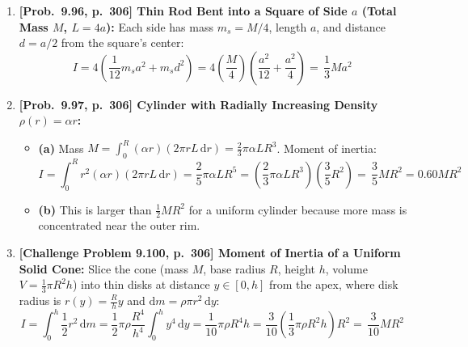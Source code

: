 \documentclass[11pt,a4paper,openany,oneside]{book}
\newcommand{\eqbox}[1]{\boxed{\,#1\,}}
\newcommand{\dd}{\,\mathrm{d}}
\newcommand{\diff}{\mathrm{d}}
\numberwithin{equation}{chapter}
\begin{document}
\begin{enumerate}[label=\textbf{Prob.\ 9.\arabic*},leftmargin=4.2em]
  \item \textbf{[Prob.\ 9.96, p.\ 306] Thin Rod Bent into a Square of Side $a$ (Total Mass $M$, $L=4a$):}
  Each side has mass $m_s = M/4$, length $a$, and distance $d = a/2$ from the square's center:
  \begin{equation*}
    I = 4\!\left(\frac{1}{12}m_s a^2 + m_s d^2\right) = 4\!\left(\frac{M}{4}\right)\!\left(\frac{a^2}{12} + \frac{a^2}{4}\right) = \eqbox{\frac{1}{3}Ma^2}
  \end{equation*}

  \item \textbf{[Prob.\ 9.97, p.\ 306] Cylinder with Radially Increasing Density $\rho(r) = \alpha r$:}
  \begin{itemize}
    \item \textbf{(a)} Mass $M = \int_0^R (\alpha r)(2\pi r L\dd r) = \frac{2}{3}\pi\alpha L R^3$. Moment of inertia:
    \begin{equation*}
      I = \int_0^R r^2(\alpha r)(2\pi r L\dd r) = \frac{2}{5}\pi\alpha L R^5 = \left(\frac{2}{3}\pi\alpha L R^3\right)\!\left(\frac{3}{5}R^2\right) = \eqbox{\frac{3}{5}MR^2 = 0.60MR^2}
    \end{equation*}
    \item \textbf{(b)} This is larger than $\frac{1}{2}MR^2$ for a uniform cylinder because more mass is concentrated near the outer rim.
  \end{itemize}

  \item \textbf{[Challenge Problem 9.100, p.\ 306] Moment of Inertia of a Uniform Solid Cone:}
  Slice the cone (mass $M$, base radius $R$, height $h$, volume $V = \frac{1}{3}\pi R^2 h$) into thin disks at distance $y\in [0,h]$ from the apex, where disk radius is $r(y) = \frac{R}{h}y$ and $\diff m = \rho\pi r^2\dd y$:
  \begin{equation*}
    I = \int_0^h \frac{1}{2}r^2\dd m = \frac{1}{2}\pi\rho\frac{R^4}{h^4}\int_0^h y^4\dd y = \frac{1}{10}\pi\rho R^4 h = \frac{3}{10}\!\left(\frac{1}{3}\pi\rho R^2 h\right)R^2 = \eqbox{\frac{3}{10}MR^2}
  \end{equation*}


\end{enumerate}
\end{document}
